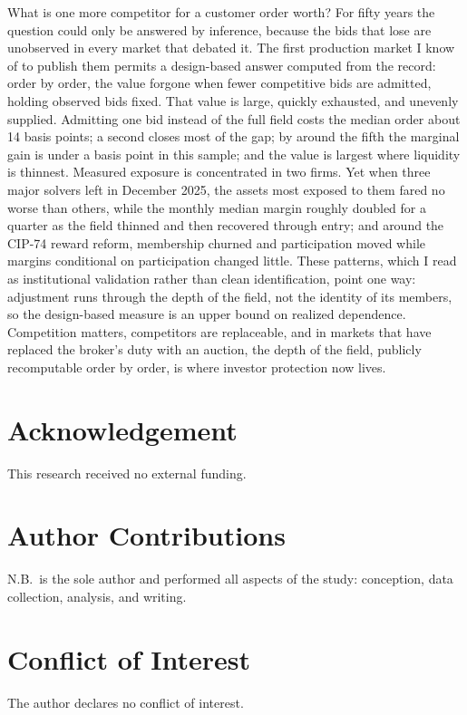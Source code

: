 \documentclass[11pt]{article}
\theoremstyle{plain}
\theoremstyle{definition}
\theoremstyle{remark}
\begin{document}
What is one more competitor for a customer order worth? For fifty years the question could only be answered by inference, because the bids that lose are unobserved in every market that debated it. The first production market I know of to publish them permits a design-based answer computed from the record: order by order, the value forgone when fewer competitive bids are admitted, holding observed bids fixed. That value is large, quickly exhausted, and unevenly supplied. Admitting one bid instead of the full field costs the median order about 14 basis points; a second closes most of the gap; by around the fifth the marginal gain is under a basis point in this sample; and the value is largest where liquidity is thinnest. Measured exposure is concentrated in two firms. Yet when three major solvers left in December 2025, the assets most exposed to them fared no worse than others, while the monthly median margin roughly doubled for a quarter as the field thinned and then recovered through entry; and around the CIP-74 reward reform, membership churned and participation moved while margins conditional on participation changed little. These patterns, which I read as institutional validation rather than clean identification, point one way: adjustment runs through the depth of the field, not the identity of its members, so the design-based measure is an upper bound on realized dependence. Competition matters, competitors are replaceable, and in markets that have replaced the broker's duty with an auction, the depth of the field, publicly recomputable order by order, is where investor protection now lives.

\section*{Acknowledgement}

This research received no external funding.

\section*{Author Contributions}

N.B.\ is the sole author and performed all aspects of the study: conception, data collection, analysis, and writing.

\section*{Conflict of Interest}

The author declares no conflict of interest.



\end{document}
